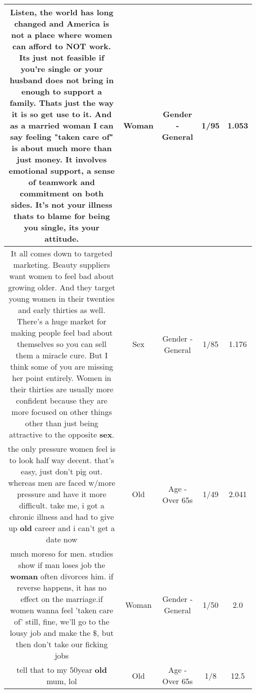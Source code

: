 \documentclass[11pt]{article}
\newlength\mylength
\begin{document}
\begin{center}
\begin{longtable}{|C{.65\mylength}|C{.30\mylength}|C{.12\mylength}|C{.12\mylength}|C{.12\mylength}|}
  \small Listen, the world has long changed and America is not a place where women can afford to NOT work.  Its just not feasible if you're single or your husband does not bring in enough to support a family.  Thats just the way it is so get use to it. And as a married \textbf{woman} I can say feeling "taken care of" is about much more than just money.  It involves emotional support, a sense of teamwork and commitment on both sides.  It's not your illness thats to blame for being you single, its your attitude.\normalsize   & Woman & Gender - General & 1/95 & 1.053 \\  \hline
  \small It all comes down to targeted marketing. Beauty suppliers want women to feel bad about growing older. And they target young women in their twenties and early thirties as well. There's a huge market for making people feel bad about themselves so you can sell them a miracle cure. But I think some of you are missing her point entirely. Women in their thirties are usually more confident because they are more focused on other things other than just being attractive to the opposite \textbf{sex}.\normalsize   & Sex & Gender - General & 1/85 & 1.176 \\  \hline
  \small the only pressure women feel is to look half way decent. that's easy, just don't pig out. whereas men are faced w/more pressure and have it more difficult. take me, i got a chronic illness and had to give up \textbf{old} career and i can't get a date now\normalsize   & Old & Age - Over 65s & 1/49 & 2.041 \\  \hline
  \small much moreso for men. studies show if man loses job the \textbf{woman} often divorces him. if reverse happens, it has no effect on the marriage.if women wanna feel 'taken care of' still, fine, we'll go to the lousy job and make the \$, but then don't take our ficking jobs\normalsize   & Woman & Gender - General & 1/50 & 2.0 \\  \hline
  \small tell that to my 50year \textbf{old} mum, lol\normalsize   & Old & Age - Over 65s & 1/8 & 12.5 \\  \hline

\end{longtable}
\end{center}
\end{document}
